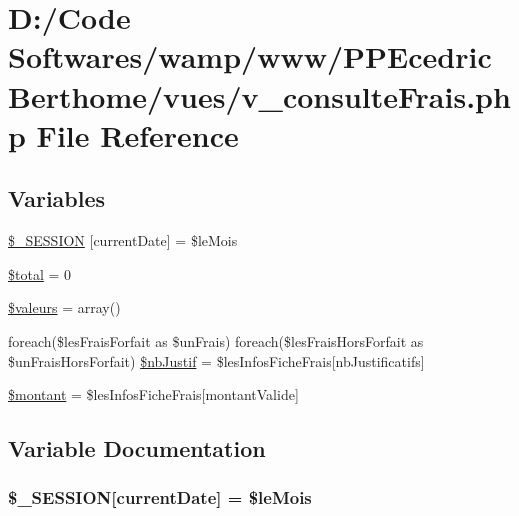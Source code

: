 \hypertarget{v__consulte_frais_8php}{}\section{D\+:/\+Code Softwares/wamp/www/\+P\+P\+Ecedric\+Berthome/vues/v\+\_\+consulte\+Frais.php File Reference}
\label{v__consulte_frais_8php}
\subsection*{Variables}
\begin{DoxyCompactItemize}
\item 
\hyperlink{v__consulte_frais_8php_a5f45fef60adb5800ccec4a479dba523c}{\$\+\_\+\+S\+E\+S\+S\+I\+ON} \mbox{[}\textquotesingle{}current\+Date\textquotesingle{}\mbox{]} = \$le\+Mois
\item 
\hyperlink{v__consulte_frais_8php_a241b818f48030b628685b2e5119c5624}{\$total} = 0
\item 
\hyperlink{v__consulte_frais_8php_a6981142b9d6529b79b559b4d3b057835}{\$valeurs} = array()
\item 
foreach(\$les\+Frais\+Forfait as \$un\+Frais) foreach(\$les\+Frais\+Hors\+Forfait as \$un\+Frais\+Hors\+Forfait) \hyperlink{v__consulte_frais_8php_a61cafff25843b416c271d6a49d782de7}{\$nb\+Justif} = \$les\+Infos\+Fiche\+Frais\mbox{[}\textquotesingle{}nb\+Justificatifs\textquotesingle{}\mbox{]}
\item 
\hyperlink{v__consulte_frais_8php_a68eb0a4a32f374b4548256f8a63eb191}{\$montant} = \$les\+Infos\+Fiche\+Frais\mbox{[}\textquotesingle{}montant\+Valide\textquotesingle{}\mbox{]}
\end{DoxyCompactItemize}


\subsection{Variable Documentation}
\subsubsection[{\texorpdfstring{\$\+\_\+\+S\+E\+S\+S\+I\+ON}{$_SESSION}}]{\setlength{\rightskip}{0pt plus 5cm}\$\+\_\+\+S\+E\+S\+S\+I\+ON\mbox{[}\textquotesingle{}current\+Date\textquotesingle{}\mbox{]} = \$le\+Mois}\hypertarget{v__consulte_frais_8php_a5f45fef60adb5800ccec4a479dba523c}{}\label{v__consulte_frais_8php_a5f45fef60adb5800ccec4a479dba523c}
